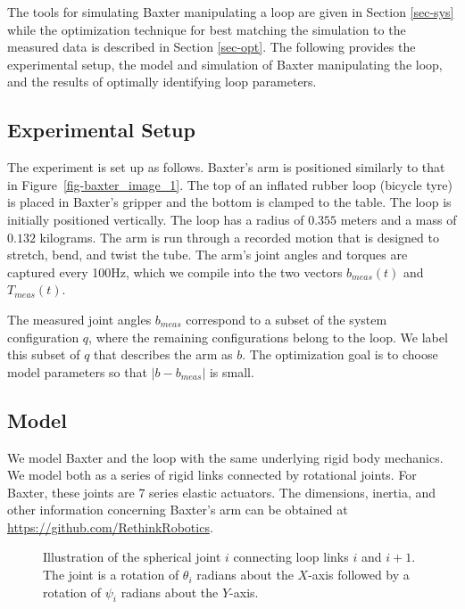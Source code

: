 \documentclass[letterpaper, 10pt, conference]{ieeeconf}
\begin{document}
The tools for simulating Baxter manipulating a loop are given in Section \ref{sec-sys} while the optimization technique for best matching the simulation to the measured data is described in Section \ref{sec-opt}.  The following provides the experimental setup, the model and simulation of Baxter manipulating the loop, and the results of optimally identifying loop parameters.

\subsection{Experimental Setup \label{sec-setup}}
The experiment is set up as follows.  Baxter's arm is positioned similarly to that in Figure~\ref{fig-baxter_image_1}.  The top of an inflated rubber loop (bicycle tyre) is placed in Baxter's gripper and the bottom is clamped to the table.   The loop is initially positioned vertically. The loop has a radius of $0.355$ meters and a mass of $0.132$ kilograms.  The arm is run through a recorded motion that is designed to stretch, bend, and twist the tube. The arm's joint angles and torques are captured every 100Hz, which we compile into the two vectors $b_{meas}(t)$ and $T_{meas}(t)$.  

The measured joint angles $b_{meas}$ correspond to a subset of the system configuration $q$, where the remaining configurations belong to the loop.  We label this subset of $q$ that describes the arm as $b$.  The optimization goal is to choose model parameters so that $|b-b_{meas}|$ is small.

\subsection{Model}
We model Baxter and the loop with the same underlying rigid body mechanics.  We model both as a series of rigid links connected by rotational joints.  For Baxter, these joints are 7 series elastic actuators.  The dimensions,  inertia, and other information concerning Baxter's arm can be obtained at \url{https://github.com/RethinkRobotics}.  

\begin{figure}[!htb]
\centering
\def\svgwidth{.97\textwidth}%

\caption{Illustration of the spherical joint $i$ connecting loop links $i$ and $i+1$.  The joint is a rotation of $\theta_i$ radians about the $X$-axis followed by a rotation of $\psi_i$ radians about the $Y$-axis. }
\label{fig-loop_link}
\end{figure}
\end{document}
